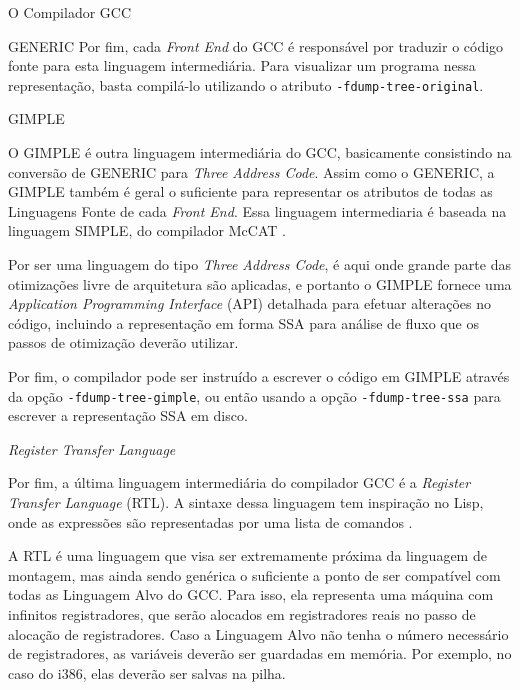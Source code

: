 \begin{section}{O Compilador GCC}
\begin{subsection}{GENERIC}
    Por fim, cada \textit{Front End} do GCC é responsável por traduzir o
código fonte para esta linguagem intermediária. Para visualizar um programa
nessa representação, basta compilá-lo utilizando o atributo
\texttt{-fdump-tree-original}.

\end{subsection}

\begin{subsection}{GIMPLE}

O GIMPLE é outra linguagem intermediária do GCC, basicamente consistindo na
conversão de GENERIC para \textit{Three Address Code}. Assim como o
GENERIC, a GIMPLE também é geral o suficiente para representar os atributos
de todas as Linguagens Fonte de cada \textit{Front End}.  Essa linguagem
intermediaria é baseada na linguagem SIMPLE, do compilador McCAT \citep{gimple}.

    Por ser uma linguagem do tipo \textit{Three Address Code}, é aqui onde
grande parte das otimizações livre de arquitetura são aplicadas, e portanto o
GIMPLE fornece uma \textit{Application Programming Interface} (API) detalhada
para efetuar alterações no código, incluindo a representação em forma SSA para análise
de fluxo que os passos de otimização deverão utilizar.

    Por fim, o compilador pode ser instruído a escrever o código em
GIMPLE através da opção \texttt{-fdump-tree-gimple}, ou então usando
a opção \texttt{-fdump-tree-ssa} para escrever a representação SSA
em disco.

\end{subsection}

\begin{subsection}{\textit{Register Transfer Language}}

    Por fim, a última linguagem intermediária do compilador GCC é a
\textit{Register Transfer Language} (RTL). A sintaxe dessa linguagem
tem inspiração no Lisp, onde as expressões são representadas por uma
lista de comandos \citep{rtl}.

    A RTL é uma linguagem que visa ser extremamente próxima da linguagem
de montagem, mas ainda sendo genérica o suficiente a ponto de ser compatível
com todas as Linguagem Alvo do GCC.
Para isso, ela representa uma máquina com infinitos
registradores, que serão alocados em registradores reais no passo de alocação de
registradores. Caso a Linguagem Alvo não tenha o número necessário de
registradores, as variáveis deverão ser guardadas em memória. Por exemplo,
no caso do i386, elas deverão ser salvas na pilha.


\end{subsection}
\end{section}
